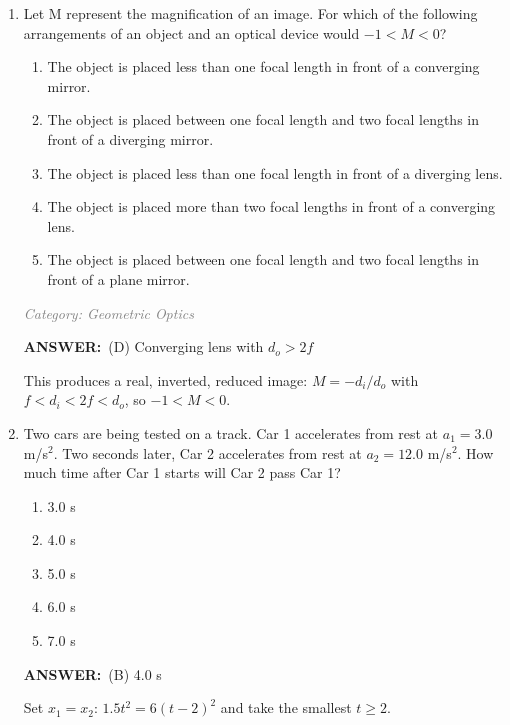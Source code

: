 ﻿\documentclass[12pt, a4paper]{article}
\makeatletter
\newcommand{\finalanswer}[1]{\textbf{ANSWER:}~#1}
\newif\if@categoryprinted
\newcommand{\category}[1]{\if@categoryprinted\relax\else\textit{\textcolor{gray}{Category: #1}}\global\@categoryprintedtrue\fi}
\newcommand{\tags}[1]{}
\makeatother
\begin{document}
\begin{CJK*}{UTF8}{gbsn}
\begin{enumerate}[itemsep=1.0em, topsep=0.6em]
\item \label{prob:34}
Let M represent the magnification of an image. For which of the following arrangements of an object and an optical device would $-1 < M < 0$? 
\begin{enumerate}[label=(\Alph*)]
    \item The object is placed less than one focal length in front of a converging mirror.
    \item The object is placed between one focal length and two focal lengths in front of a diverging mirror.
    \item The object is placed less than one focal length in front of a diverging lens.
    \item The object is placed more than two focal lengths in front of a converging lens.
    \item The object is placed between one focal length and two focal lengths in front of a plane mirror.
\end{enumerate}

\category{Geometric Optics} \tags{}
\begin{answerbox}
\finalanswer{(D) Converging lens with $d_o>2f$}
\end{answerbox}
\begin{solutionbox}

This produces a real, inverted, reduced image: $M=-d_i/d_o$ with $f<d_i<2f<d_o$, so $-1<M<0$.
\end{solutionbox}

\newpage

\item \label{prob:35}
Two cars are being tested on a track. Car 1 accelerates from rest at $a_1=3.0$ m/s$^2$. Two seconds later, Car 2 accelerates from rest at $a_2=12.0$ m/s$^2$. How much time after Car 1 starts will Car 2 pass Car 1?
\begin{enumerate}[label=(\Alph*)]
    \item 3.0 s
    \item 4.0 s
    \item 5.0 s
    \item 6.0 s
    \item 7.0 s
\end{enumerate}

\category{Kinematics} \tags{}
\begin{answerbox}
\finalanswer{(B) 4.0 s}
\end{answerbox}
\begin{insightbox}
Set $x_1=x_2$: $1.5t^2=6(t-2)^2$ and take the smallest $t\ge2$.
\end{insightbox}
\begin{solutionbox}


\end{solutionbox}
\end{enumerate}
\end{CJK*}
\end{document}
